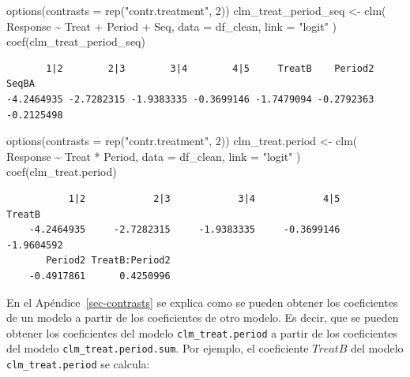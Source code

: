 \documentclass[
  12pt,
  a4paper,
  extrafontsizes,
  onecolumn,
  openright]{memoir}
\newenvironment{Shaded}{\begin{snugshade}}{\end{snugshade}}
\newcommand{\AttributeTok}[1]{\textcolor[rgb]{0.40,0.45,0.13}{#1}}
\newcommand{\DecValTok}[1]{\textcolor[rgb]{0.68,0.00,0.00}{#1}}
\newcommand{\FunctionTok}[1]{\textcolor[rgb]{0.28,0.35,0.67}{#1}}
\newcommand{\NormalTok}[1]{\textcolor[rgb]{0.00,0.23,0.31}{#1}}
\newcommand{\OtherTok}[1]{\textcolor[rgb]{0.00,0.23,0.31}{#1}}
\newcommand{\SpecialCharTok}[1]{\textcolor[rgb]{0.37,0.37,0.37}{#1}}
\newcommand{\StringTok}[1]{\textcolor[rgb]{0.13,0.47,0.30}{#1}}
\begin{document}
\scriptsize

\begin{Shaded}
\begin{Highlighting}[]
\FunctionTok{options}\NormalTok{(}\AttributeTok{contrasts =} \FunctionTok{rep}\NormalTok{(}\StringTok{"contr.treatment"}\NormalTok{, }\DecValTok{2}\NormalTok{))}
\NormalTok{clm\_treat\_period\_seq }\OtherTok{\textless{}{-}}
    \FunctionTok{clm}\NormalTok{(}
\NormalTok{        Response }\SpecialCharTok{\textasciitilde{}}\NormalTok{ Treat }\SpecialCharTok{+}\NormalTok{ Period }\SpecialCharTok{+}\NormalTok{ Seq,}
        \AttributeTok{data =}\NormalTok{ df\_clean, }\AttributeTok{link =} \StringTok{"logit"}
\NormalTok{    )}
\FunctionTok{coef}\NormalTok{(clm\_treat\_period\_seq)}
\end{Highlighting}
\end{Shaded}

\begin{verbatim}
       1|2        2|3        3|4        4|5     TreatB    Period2      SeqBA 
-4.2464935 -2.7282315 -1.9383335 -0.3699146 -1.7479094 -0.2792363 -0.2125498 
\end{verbatim}

\begin{Shaded}
\begin{Highlighting}[]
\FunctionTok{options}\NormalTok{(}\AttributeTok{contrasts =} \FunctionTok{rep}\NormalTok{(}\StringTok{"contr.treatment"}\NormalTok{, }\DecValTok{2}\NormalTok{))}
\NormalTok{clm\_treat.period }\OtherTok{\textless{}{-}}
    \FunctionTok{clm}\NormalTok{(}
\NormalTok{        Response }\SpecialCharTok{\textasciitilde{}}\NormalTok{ Treat }\SpecialCharTok{*}\NormalTok{ Period,}
        \AttributeTok{data =}\NormalTok{ df\_clean, }\AttributeTok{link =} \StringTok{"logit"}
\NormalTok{    )}
\FunctionTok{coef}\NormalTok{(clm\_treat.period)}
\end{Highlighting}
\end{Shaded}

\begin{verbatim}
           1|2            2|3            3|4            4|5         TreatB 
    -4.2464935     -2.7282315     -1.9383335     -0.3699146     -1.9604592 
       Period2 TreatB:Period2 
    -0.4917861      0.4250996 
\end{verbatim}

\normalsize

En el Apéndice~\ref{sec-contrasts} se explica como se pueden obtener los
coeficientes de un modelo a partir de los coeficientes de otro modelo.
Es decir, que se pueden obtener los coeficientes del modelo
\texttt{clm\_treat.period} a partir de los coeficientes del modelo
\texttt{clm\_treat.period.sum}. Por ejemplo, el coeficiente \(TreatB\)
del modelo \texttt{clm\_treat.period} se calcula:
\end{document}
